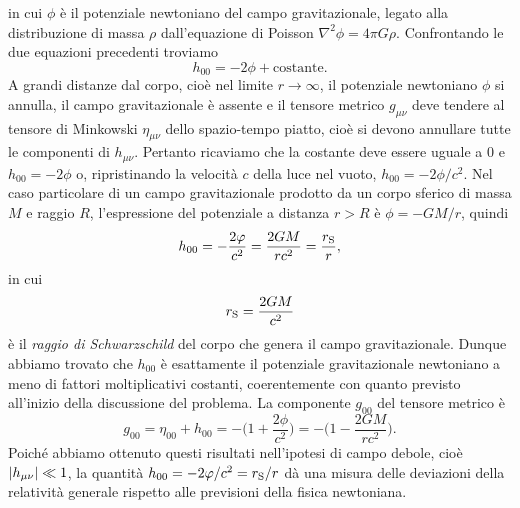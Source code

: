 in cui $\phi$ è il potenziale newtoniano del campo gravitazionale, legato alla
distribuzione di massa $\rho$
dall'equazione di
Poisson $\nabla^{2} \phi = 4\pi G\rho$.  Confrontando le due equazioni
precedenti troviamo
\begin{equation}
  h_{00} = -2\phi + \text{costante}.
\end{equation}
A grandi distanze dal corpo, cioè nel limite $r \to \infty$, il potenziale
newtoniano $\phi$ si annulla, il campo gravitazionale è assente e il tensore
metrico $g_{\mu\nu}$ deve tendere al tensore di Minkowski $\eta_{\mu\nu}$ dello
spazio-tempo piatto, cioè si devono annullare tutte le componenti di
$h_{\mu\nu}$.  Pertanto ricaviamo che la costante deve essere uguale a $0$ e
$h_{00} = -2\phi$ o, ripristinando la velocità $c$ della luce nel vuoto,
$h_{00} = -2\phi/c^{2}$.  Nel caso particolare di un campo gravitazionale
prodotto da un corpo sferico di massa $M$ e raggio $R$, l'espressione del
potenziale a distanza $r > R$ è $\phi = -GM/r$, quindi
\begin{equation}
  \label{eq:h00}
  h_{00} = -\frac{2\phi}{c^{2}} = \frac{2GM}{rc^{2}} = \frac{r_{\textup{S}}}{r},
\end{equation}
in cui
\begin{equation}
  r_{\textup{S}} = \frac{2GM}{c^{2}}
\end{equation}
è il \emph{raggio di Schwarzschild} del corpo che
genera il campo gravitazionale.  Dunque abbiamo trovato che $h_{00}$ è
esattamente il potenziale gravitazionale newtoniano a meno di fattori
moltiplicativi costanti, coerentemente con quanto previsto all'inizio della
discussione del problema.  La componente $g_{00}$ del tensore metrico è
\begin{equation}
  g_{00} = \eta_{00} + h_{00} = -\bigg(1 + \frac{2\phi}{c^{2}}\bigg) = -
  \bigg(1 - \frac{2GM}{rc^{2}} \bigg).
\end{equation}
Poiché abbiamo ottenuto questi risultati nell'ipotesi di campo debole, cioè
$\abs{h_{\mu\nu}} \ll 1$, la quantità $h_{00} = -2\phi/c^{2} = r_{\textup{S}}/r$
dà una misura delle deviazioni della relatività generale rispetto alle
previsioni della fisica newtoniana.

